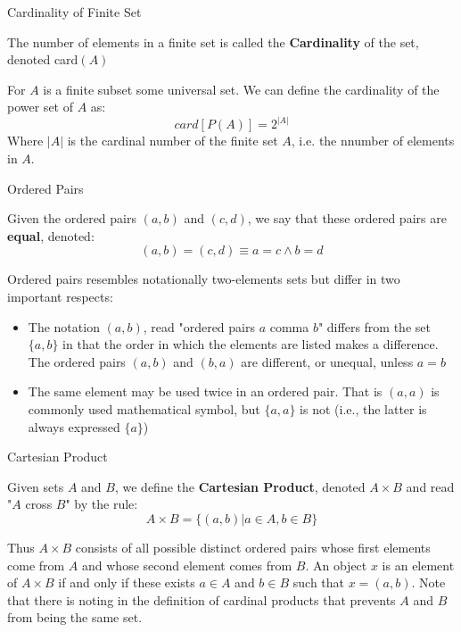 \begin{definition}
Cardinality of Finite Set \\

\begin{tcolorbox}
    The number of elements in a finite set is called the \textbf{Cardinality} of the set, denoted card$(A)$
\end{tcolorbox}
For $A$ is a finite subset some universal set. We can define the cardinality of the power set of $A$ as: 
    \begin{equation*}
        card[P(A)] = 2^|A|
    \end{equation*}
Where $|A|$ is the cardinal number of the finite set $A$, i.e. the nnumber of elements in $A$.
\end{definition}

\begin{definition}
Ordered Pairs \\

\begin{tcolorbox}
    Given the ordered pairs $(a,b)$ and $(c,d)$, we say that these ordered pairs are \textbf{equal}, denoted:
    \begin{equation*}
        (a,b)=(c,d) \equiv  a=c \wedge b=d
    \end{equation*}
\end{tcolorbox}
Ordered pairs resembles notationally two-elements sets but differ in two important respects:
    \begin{itemize}
        \item The notation $(a,b)$, read "ordered pairs $a$ comma $b$" differs from the set $\{a,b\}$ in that the order in which the elements are listed makes a difference. The ordered pairs $(a,b)$ and $(b,a)$ are different, or unequal, unless $a=b$
        
        \item The same element may be used twice in an ordered pair. That is $(a,a)$ is commonly used mathematical symbol, but $\{a,a\}$ is not (i.e., the latter is always expressed $\{a\}$)
    \end{itemize}
\end{definition}

\begin{definition}
Cartesian Product \\

\begin{tcolorbox}
    Given sets $A$ and $B$, we define the \textbf{Cartesian Product}, denoted $A \times B$ and read "$A$ cross $B$" by the rule:
        \begin{equation*}
            A \times B = \{ (a,b) | a \in A, b \in B \}
        \end{equation*}
\end{tcolorbox}
Thus $A \times B$ consists of all possible distinct ordered pairs whose first elements come from $A$ and whose second element comes from $B$. An object $x$ is an element of $A \times B$ if and only if these exists $a \in A$ and $b \in B$ such that $x = (a,b)$. Note that there is noting in the definition of cardinal products that prevents $A$ and $B$ from being the same set.
\end{definition}

